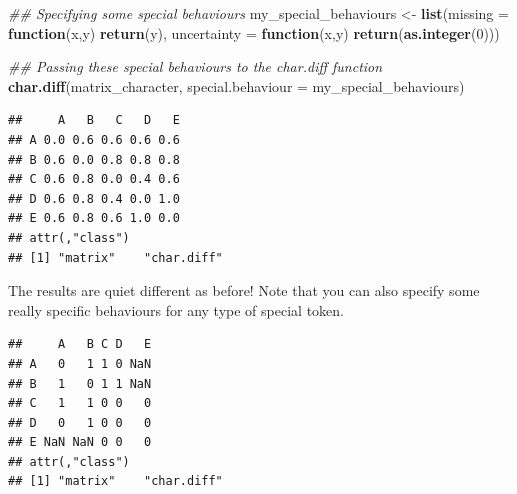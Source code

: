 \documentclass[]{book}
\newenvironment{Shaded}{\begin{snugshade}}{\end{snugshade}}
\newcommand{\CommentTok}[1]{\textcolor[rgb]{0.56,0.35,0.01}{\textit{#1}}}
\newcommand{\ControlFlowTok}[1]{\textcolor[rgb]{0.13,0.29,0.53}{\textbf{#1}}}
\newcommand{\DataTypeTok}[1]{\textcolor[rgb]{0.13,0.29,0.53}{#1}}
\newcommand{\DecValTok}[1]{\textcolor[rgb]{0.00,0.00,0.81}{#1}}
\newcommand{\KeywordTok}[1]{\textcolor[rgb]{0.13,0.29,0.53}{\textbf{#1}}}
\newcommand{\NormalTok}[1]{#1}
\newcommand{\OperatorTok}[1]{\textcolor[rgb]{0.81,0.36,0.00}{\textbf{#1}}}
\newcommand{\StringTok}[1]{\textcolor[rgb]{0.31,0.60,0.02}{#1}}
\begin{document}
\begin{Shaded}
\begin{Highlighting}[]
\CommentTok{## Specifying some special behaviours}
\NormalTok{my_special_behaviours <-}\StringTok{ }\KeywordTok{list}\NormalTok{(}\DataTypeTok{missing =} \ControlFlowTok{function}\NormalTok{(x,y) }\KeywordTok{return}\NormalTok{(y),}
                              \DataTypeTok{uncertainty =} \ControlFlowTok{function}\NormalTok{(x,y) }\KeywordTok{return}\NormalTok{(}\KeywordTok{as.integer}\NormalTok{(}\DecValTok{0}\NormalTok{)))}

\CommentTok{## Passing these special behaviours to the char.diff function}
\KeywordTok{char.diff}\NormalTok{(matrix_character, }\DataTypeTok{special.behaviour =}\NormalTok{ my_special_behaviours)}
\end{Highlighting}
\end{Shaded}

\begin{verbatim}
##     A   B   C   D   E
## A 0.0 0.6 0.6 0.6 0.6
## B 0.6 0.0 0.8 0.8 0.8
## C 0.6 0.8 0.0 0.4 0.6
## D 0.6 0.8 0.4 0.0 1.0
## E 0.6 0.8 0.6 1.0 0.0
## attr(,"class")
## [1] "matrix"    "char.diff"
\end{verbatim}

The results are quiet different as before! Note that you can also specify some really specific behaviours for any type of special token.

\begin{Shaded}
\end{Shaded}

\begin{verbatim}
##     A   B C D   E
## A   0   1 1 0 NaN
## B   1   0 1 1 NaN
## C   1   1 0 0   0
## D   0   1 0 0   0
## E NaN NaN 0 0   0
## attr(,"class")
## [1] "matrix"    "char.diff"
\end{verbatim}
\end{document}
